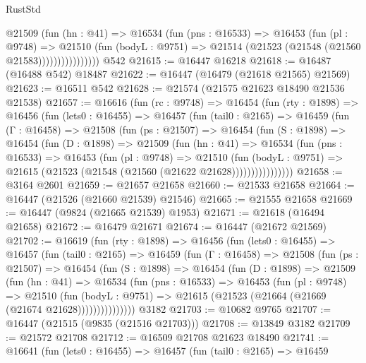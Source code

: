 \begin{lexlean}{RustStd}
\begin{coremodule}
                    @21509
                      (fun (hn : @41) =>
                      @16534
                        (fun (pns : @16533) =>
                        @16453
                          (fun (pl : @9748) =>
                          @21510
                            (fun (bodyL : @9751) =>
                            @21514 (@21523 (@21548 (@21560 @21583))))))))))))))))
    @542
@21615 := @16447 @16218
@21618 := @16487 (@16488 @542) @18487
@21622 := @16447 (@16479 (@21618 @21565) @21569)
@21623 := @16511 @542
@21628 := @21574 (@21575 @21623 @18490 @21536 @21538)
@21657 := @16616
    (fun (rc : @9748) =>
    @16454
      (fun (rty : @1898) =>
      @16456
        (fun (lets0 : @16455) =>
        @16457
          (fun (tail0 : @2165) =>
          @16459
            (fun (Γ : @16458) =>
            @21508
              (fun (ps : @21507) =>
              @16454
                (fun (S : @1898) =>
                @16454
                  (fun (D : @1898) =>
                  @21509
                    (fun (hn : @41) =>
                    @16534
                      (fun (pns : @16533) =>
                      @16453
                        (fun (pl : @9748) =>
                        @21510
                          (fun (bodyL : @9751) =>
                          @21615 (@21523 (@21548 (@21560 (@21622 @21628))))))))))))))))
@21658 := @3164 @2601
@21659 := @21657 @21658
@21660 := @21533 @21658
@21664 := @16447 (@21526 (@21660 @21539) @21546)
@21665 := @21555 @21658
@21669 := @16447 (@9824 (@21665 @21539) @1953)
@21671 := @21618 (@16494 @21658)
@21672 := @16479 @21671
@21674 := @16447 (@21672 @21569)
@21702 := @16619
    (fun (rty : @1898) =>
    @16456
      (fun (lets0 : @16455) =>
      @16457
        (fun (tail0 : @2165) =>
        @16459
          (fun (Γ : @16458) =>
          @21508
            (fun (ps : @21507) =>
            @16454
              (fun (S : @1898) =>
              @16454
                (fun (D : @1898) =>
                @21509
                  (fun (hn : @41) =>
                  @16534
                    (fun (pns : @16533) =>
                    @16453
                      (fun (pl : @9748) =>
                      @21510
                        (fun (bodyL : @9751) =>
                        @21615 (@21523 (@21664 (@21669 (@21674 @21628)))))))))))))))
    @3182
@21703 := @10682 @9765
@21707 := @16447 (@21515 (@9835 (@21516 @21703)))
@21708 := @13849 @3182
@21709 := @21572 @21708
@21712 := @16509 @21708 @21623 @18490
@21741 := @16641
    (fun (lets0 : @16455) =>
    @16457
      (fun (tail0 : @2165) =>
      @16459

\end{coremodule}
\end{lexlean}
